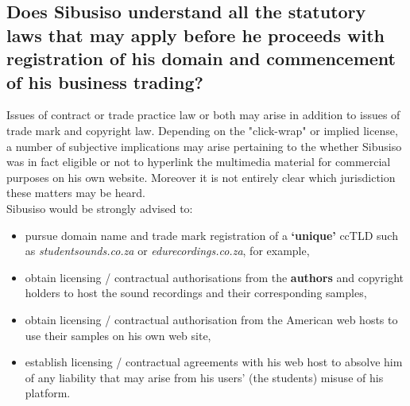 \documentclass[11pt]{article}
\begin{document}
\subsection{Does Sibusiso understand all the statutory laws that may apply before he proceeds with registration of his domain and commencement of his business trading?}
\label{sec:org7ca03aa}
Issues of contract or trade practice law or both may arise in addition to issues
of trade mark and copyright law. Depending on the "click-wrap" or implied license, a number of
subjective implications may arise pertaining to the whether Sibusiso was in fact
eligible or not to hyperlink the multimedia material for commercial purposes on
his own website. Moreover it is not entirely clear which jurisdiction these
matters may be heard.\\

Sibusiso would be strongly advised to:
\begin{itemize}
\item pursue domain name and trade mark registration of a \textbf{`unique'} ccTLD such as
\emph{studentsounds.co.za} or \emph{edurecordings.co.za}, for example,
\item obtain licensing / contractual authorisations from the \textbf{authors} and copyright holders to host
the sound recordings and their corresponding samples,
\item obtain licensing / contractual authorisation from the American web hosts to use
their samples on his own web site,
\item establish licensing / contractual agreements with his web host to absolve him
of any liability that may arise from his users' (the students) misuse of his platform.
\end{itemize}
\newpage
\printbibliography
\end{document}
